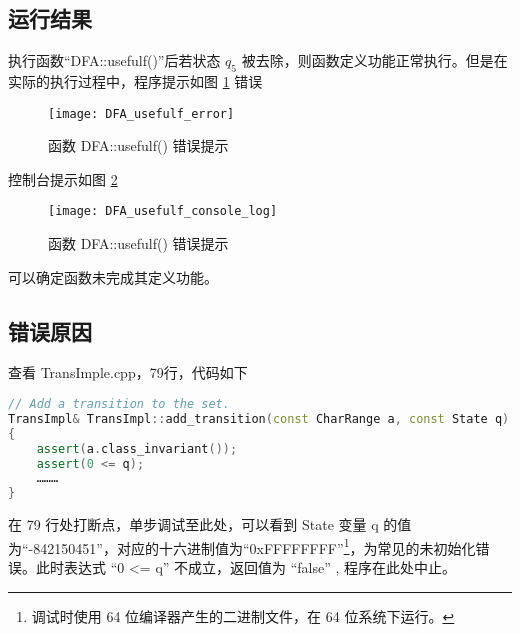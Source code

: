 \subsection{运行结果}

执行函数“DFA::usefulf()”后若状态 $q_5$ 被去除，则函数定义功能正常执行。但是在实际的执行过程中，程序提示如图 \ref{fig::usefulf_error} 错误 

\begin{figure}[!htbp]
    \centering
    \texttt{[image: DFA\_usefulf\_error]}
    \caption{函数 DFA::usefulf() 错误提示}
    \label{fig::usefulf_error}
\end{figure}
控制台提示如图 \ref{fig::usefulf_console_log}
\begin{figure}[!htbp]
    \centering
    \texttt{[image: DFA\_usefulf\_console\_log]}
    \caption{函数 DFA::usefulf() 错误提示}
    \label{fig::usefulf_console_log}
\end{figure}

可以确定函数未完成其定义功能。

\subsection{错误原因}

查看 TransImple.cpp，79行，代码如下
\lstset{style=mystyle}
\begin{lstlisting}[language=C++,label={lst:TransImple},caption={ TransImple.cpp },firstnumber=75]
// Add a transition to the set.
TransImpl& TransImpl::add_transition(const CharRange a, const State q)
{
    assert(a.class_invariant());
    assert(0 <= q);
    ………
}
\end{lstlisting}

在 79 行处打断点，单步调试至此处，可以看到 State 变量 q 的值为“-842150451”，对应的十六进制值为“0xFFFFFFFF”\footnote{调试时使用 64 位编译器产生的二进制文件，在 64 位系统下运行。}，为常见的未初始化错误。此时表达式 “0 <= q” 不成立，返回值为 “false” , 程序在此处中止。

